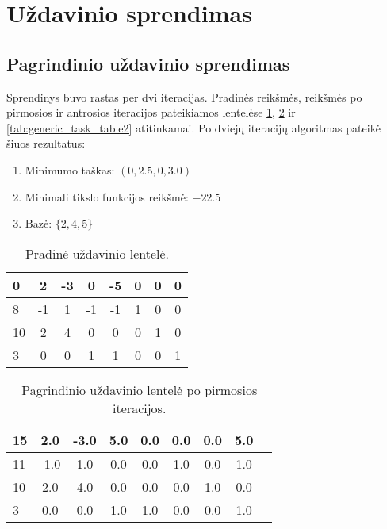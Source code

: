 \documentclass[a4paper,12pt,fleqn]{article}
\begin{document}
\pagebreak
\section{Uždavinio sprendimas}
\subsection{Pagrindinio uždavinio sprendimas}

Sprendinys buvo rastas per dvi iteracijas. Pradinės reikšmės, reikšmės po pirmosios ir antrosios iteracijos pateikiamos lentelėse \ref{tab:generic_task_table}, \ref{tab:generic_task_table1} ir \ref{tab:generic_task_table2} atitinkamai. Po dviejų iteracijų algoritmas pateikė šiuos rezultatus:

\begin{enumerate}
\item Minimumo taškas: $\left(0, 2.5, 0, 3.0\right)$
\item Minimali tikslo funkcijos reikšmė: $-22.5$
\item Bazė: $\{2, 4, 5\}$
\end{enumerate}

\begin{table}[h!]
\centering
\caption{Pradinė uždavinio lentelė.}
\label{tab:generic_task_table}
\begin{tabular}{@{}lccccccc@{}}
\toprule
0 & 2 & -3 & 0 & -5 & 0 & 0 & 0 \\ \midrule
8 & -1 & 1 & -1 & -1 & 1 & 0 & 0 \\
10 & 2 & 4 & 0 & 0 & 0 & 1 & 0 \\
3 & 0 & 0 & 1 & 1 & 0 & 0 & 1 \\ \bottomrule
\end{tabular}
\end{table}

\begin{table}[h!]
\centering
\caption{Pagrindinio uždavinio lentelė po pirmosios iteracijos.}
\label{tab:generic_task_table1}
\begin{tabular}{@{}lcccccccc@{}}
\toprule
15 & 2.0 & -3.0 & 5.0 & 0.0 & 0.0 & 0.0 & 5.0 \\ \midrule
11 & -1.0 & 1.0 & 0.0 & 0.0 & 1.0 & 0.0 & 1.0 \\
10 & 2.0 & 4.0 & 0.0 & 0.0 & 0.0 & 1.0 & 0.0 \\
3 & 0.0 & 0.0 & 1.0 & 1.0 & 0.0 & 0.0 & 1.0 \\ \bottomrule
\end{tabular}
\end{table}
\end{document}
